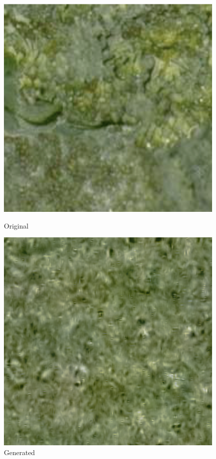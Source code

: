\documentclass{article}
\begin{document}
    \begin{figure}[!htb]
    \begin{center}
      \includegraphics[scale=.32]{5/report/steerable/1.png}
      \caption{Original}
    \end{center}
    \endminipage \hfill
    \begin{center}
      \includegraphics[scale=.32]{5/report/steerable/1_c.png}
      \caption{Generated}
    \end{center}
    \endminipage
    \end{figure} 
\end{document}
